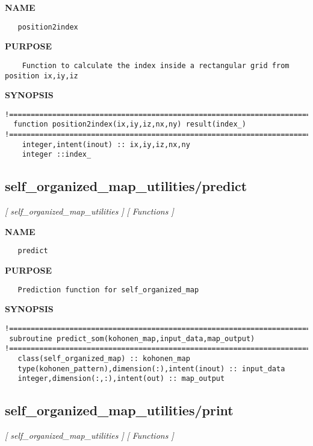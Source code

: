 \documentclass{article}
\begin{document}
\label{ch:robo49}
\label{ch:self_organized_map_utilities_position2index}
\textbf{NAME}
\begin{verbatim}
   position2index
\end{verbatim}
\textbf{PURPOSE}
\begin{verbatim}
    Function to calculate the index inside a rectangular grid from position ix,iy,iz
\end{verbatim}
\textbf{SYNOPSIS}
\begin{verbatim}
!========================================================================================
  function position2index(ix,iy,iz,nx,ny) result(index_)
!========================================================================================
    integer,intent(inout) :: ix,iy,iz,nx,ny
    integer ::index_
\end{verbatim}
\newpage
\subsection{self\_organized\_map\_utilities/predict}
\textsl{[ self\_organized\_map\_utilities ]}
\textsl{[ Functions ]}

\label{ch:robo50}
\label{ch:self_organized_map_utilities_predict}
\textbf{NAME}
\begin{verbatim}
   predict
\end{verbatim}
\textbf{PURPOSE}
\begin{verbatim}
   Prediction function for self_organized_map 
\end{verbatim}
\textbf{SYNOPSIS}
\begin{verbatim}
!========================================================================================
 subroutine predict_som(kohonen_map,input_data,map_output)
!========================================================================================
   class(self_organized_map) :: kohonen_map
   type(kohonen_pattern),dimension(:),intent(inout) :: input_data
   integer,dimension(:,:),intent(out) :: map_output
\end{verbatim}
\newpage
\subsection{self\_organized\_map\_utilities/print}
\textsl{[ self\_organized\_map\_utilities ]}
\textsl{[ Functions ]}
\end{document}
